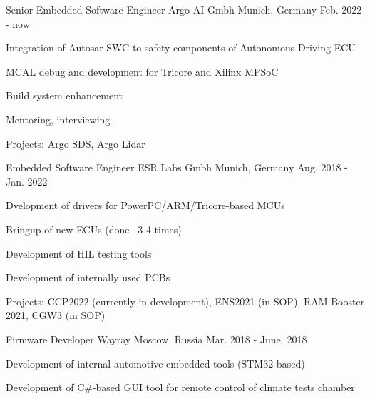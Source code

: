 


\begin{cventries}


\cventry
{Senior Embedded Software Engineer} %
{Argo AI Gmbh} %
{Munich, Germany} %
{Feb. 2022 - now} %
{ %
\begin{cvitems}
\item {Integration of Autosar SWC to safety components of Autonomous Driving ECU}
\item {MCAL debug and development for Tricore and Xilinx MPSoC}
\item {Build system enhancement }
\item {Mentoring, interviewing}
\item {Projects: Argo SDS, Argo Lidar}
\end{cvitems}
}


\cventry
{Embedded Software Engineer} %
{ESR Labs Gmbh } %
{Munich, Germany} %
{Aug. 2018 - Jan. 2022} %
{ %
\begin{cvitems}
\item {Dvelopment of drivers for PowerPC/ARM/Tricore-based MCUs}
\item {Bringup of new ECUs (done ~3-4 times)}
\item {Development of HIL testing tools}
\item {Development of internally used PCBs}
\item {Projects: CCP2022 (currently in development), ENS2021 (in SOP), RAM Booster 2021, CGW3 (in SOP)}
\end{cvitems}
}

\cventry
{Firmware Developer} %
{Wayray} %
{Moscow, Russia} %
{Mar. 2018 - June. 2018} %
{ %
\begin{cvitems}
\item {Development of internal automotive embedded tools (STM32-based)}
\item {Development of C\#-based GUI tool for remote control of climate tests chamber}
\end{cvitems}
}


\end{cventries}
